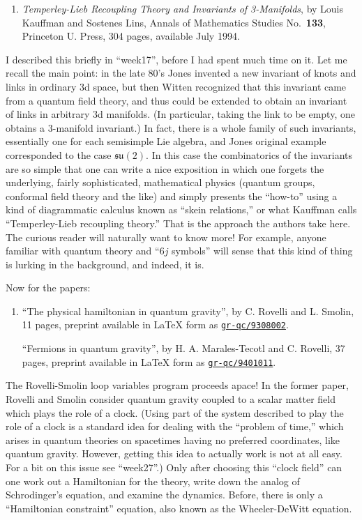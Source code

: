 \documentclass{article}
\def\tightlist{}
\begin{document}
\begin{enumerate}
\def\labelenumi{\arabic{enumi})}
\setcounter{enumi}{2}
\tightlist
\item
  \emph{Temperley-Lieb Recoupling Theory and Invariants of 3-Manifolds},
  by Louis Kauffman and Sostenes Lins, Annals of Mathematics Studies
  No.~\textbf{133}, Princeton U. Press, 304 pages, available July 1994.
\end{enumerate}

I described this briefly in ``week17'', before I had spent much time on
it. Let me recall the main point: in the late 80's Jones invented a new
invariant of knots and links in ordinary 3d space, but then Witten
recognized that this invariant came from a quantum field theory, and
thus could be extended to obtain an invariant of links in arbitrary 3d
manifolds. (In particular, taking the link to be empty, one obtains a
3-manifold invariant.) In fact, there is a whole family of such
invariants, essentially one for each semisimple Lie algebra, and Jones
original example corresponded to the case \(\mathfrak{su}(2)\). In this
case the combinatorics of the invariants are so simple that one can
write a nice exposition in which one forgets the underlying, fairly
sophisticated, mathematical physics (quantum groups, conformal field
theory and the like) and simply presents the ``how-to'' using a kind of
diagrammatic calculus known as ``skein relations,'' or what Kauffman
calls ``Temperley-Lieb recoupling theory.'' That is the approach the
authors take here. The curious reader will naturally want to know more!
For example, anyone familiar with quantum theory and ``\(6j\) symbols''
will sense that this kind of thing is lurking in the background, and
indeed, it is.

Now for the papers:

\begin{enumerate}
\def\labelenumi{\arabic{enumi})}
\setcounter{enumi}{3}
\item
  ``The physical hamiltonian in quantum gravity'', by C. Rovelli and L.
  Smolin, 11 pages, preprint available in LaTeX form as
  \href{http://xxx.lanl.gov/abs/gr-qc/9308002}{\texttt{gr-qc/9308002}}.

  ``Fermions in quantum gravity'', by H. A. Marales-Tecotl and C.
  Rovelli, 37 pages, preprint available in LaTeX form as
  \href{http://xxx.lanl.gov/abs/gr-qc/9401011}{\texttt{gr-qc/9401011}}.
\end{enumerate}

The Rovelli-Smolin loop variables program proceeds apace! In the former
paper, Rovelli and Smolin consider quantum gravity coupled to a scalar
matter field which plays the role of a clock. (Using part of the system
described to play the role of a clock is a standard idea for dealing
with the ``problem of time,'' which arises in quantum theories on
spacetimes having no preferred coordinates, like quantum gravity.
However, getting this idea to actually work is not at all easy. For a
bit on this issue see ``week27''.) Only after choosing this ``clock
field'' can one work out a Hamiltonian for the theory, write down the
analog of Schrodinger's equation, and examine the dynamics. Before,
there is only a ``Hamiltonian constraint'' equation, also known as the
Wheeler-DeWitt equation.
\end{document}
